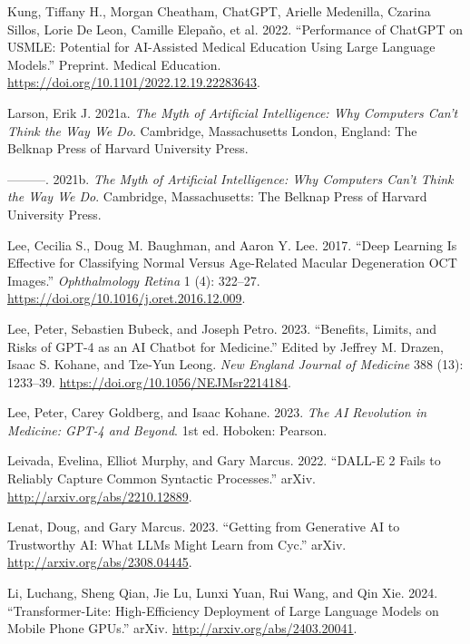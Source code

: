 \documentclass[
  Letterpaper,
]{scrbook}
\newlength{\cslhangindent}
\newenvironment{CSLReferences}[2] %
 {\begin{list}{}{%
  \setlength{\itemindent}{0pt}
  \setlength{\leftmargin}{0pt}
  \setlength{\parsep}{0pt}
  \ifodd #1
   \setlength{\leftmargin}{\cslhangindent}
   \setlength{\itemindent}{-1\cslhangindent}
  \fi
  \setlength{\itemsep}{#2\baselineskip}}}
 {\end{list}}
\begin{document}
\begin{CSLReferences}{1}{0}
Kung, Tiffany H., Morgan Cheatham, ChatGPT, Arielle Medenilla, Czarina
Sillos, Lorie De Leon, Camille Elepaño, et al. 2022. {``Performance of
{ChatGPT} on {USMLE}: {Potential} for {AI}-{Assisted} {Medical}
{Education} {Using} {Large} {Language} {Models}.''} Preprint. Medical
Education. \url{https://doi.org/10.1101/2022.12.19.22283643}.

Larson, Erik J. 2021a. \emph{The Myth of Artificial Intelligence: Why
Computers Can't Think the Way We Do}. Cambridge, Massachusetts London,
England: The Belknap Press of Harvard University Press.

---------. 2021b. \emph{The Myth of Artificial Intelligence: Why
Computers Can't Think the Way We Do}. Cambridge, Massachusetts: The
Belknap Press of Harvard University Press.

Lee, Cecilia S., Doug M. Baughman, and Aaron Y. Lee. 2017. {``Deep
{Learning} {Is} {Effective} for {Classifying} {Normal} Versus
{Age}-{Related} {Macular} {Degeneration} {OCT} {Images}.''}
\emph{Ophthalmology Retina} 1 (4): 322--27.
\url{https://doi.org/10.1016/j.oret.2016.12.009}.

Lee, Peter, Sebastien Bubeck, and Joseph Petro. 2023. {``Benefits,
{Limits}, and {Risks} of {GPT}-4 as an {AI} {Chatbot} for {Medicine}.''}
Edited by Jeffrey M. Drazen, Isaac S. Kohane, and Tze-Yun Leong.
\emph{New England Journal of Medicine} 388 (13): 1233--39.
\url{https://doi.org/10.1056/NEJMsr2214184}.

Lee, Peter, Carey Goldberg, and Isaac Kohane. 2023. \emph{The {AI}
Revolution in Medicine: {GPT}-4 and Beyond}. 1st ed. Hoboken: Pearson.

Leivada, Evelina, Elliot Murphy, and Gary Marcus. 2022. {``{DALL}-{E} 2
{Fails} to {Reliably} {Capture} {Common} {Syntactic} {Processes}.''}
arXiv. \url{http://arxiv.org/abs/2210.12889}.

Lenat, Doug, and Gary Marcus. 2023. {``Getting from {Generative} {AI} to
{Trustworthy} {AI}: {What} {LLMs} Might Learn from {Cyc}.''} arXiv.
\url{http://arxiv.org/abs/2308.04445}.

Li, Luchang, Sheng Qian, Jie Lu, Lunxi Yuan, Rui Wang, and Qin Xie.
2024. {``Transformer-{Lite}: {High}-Efficiency {Deployment} of {Large}
{Language} {Models} on {Mobile} {Phone} {GPUs}.''} arXiv.
\url{http://arxiv.org/abs/2403.20041}.


\end{CSLReferences}
\end{document}
